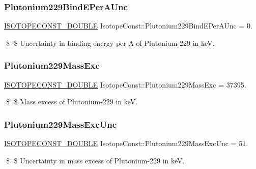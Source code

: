 \subsubsection{\texorpdfstring{Plutonium229\+Bind\+E\+Per\+A\+Unc}{Plutonium229BindEPerAUnc}}
{\footnotesize\ttfamily \mbox{\hyperlink{group___isotope_const-_macros_ga8f45a7272ce02c0b4c65c44636ed719a}{I\+S\+O\+T\+O\+P\+E\+C\+O\+N\+S\+T\+\_\+\+D\+O\+U\+B\+LE}} Isotope\+Const\+::\+Plutonium229\+Bind\+E\+Per\+A\+Unc = 0.}

\$ \$ Uncertainty in binding energy per A of Plutonium-\/229 in keV. \mbox{\label{group___isotope_const-_plutonium-_pu229_ga1e79eff8f6f987afc654c541a3240732}} 
\subsubsection{\texorpdfstring{Plutonium229\+Mass\+Exc}{Plutonium229MassExc}}
{\footnotesize\ttfamily \mbox{\hyperlink{group___isotope_const-_macros_ga8f45a7272ce02c0b4c65c44636ed719a}{I\+S\+O\+T\+O\+P\+E\+C\+O\+N\+S\+T\+\_\+\+D\+O\+U\+B\+LE}} Isotope\+Const\+::\+Plutonium229\+Mass\+Exc = 37395.}

\$ \$ Mass excess of Plutonium-\/229 in keV. \mbox{\label{group___isotope_const-_plutonium-_pu229_ga1d9d57cf21f9aab3d7fa4d27a9cb4260}} 
\subsubsection{\texorpdfstring{Plutonium229\+Mass\+Exc\+Unc}{Plutonium229MassExcUnc}}
{\footnotesize\ttfamily \mbox{\hyperlink{group___isotope_const-_macros_ga8f45a7272ce02c0b4c65c44636ed719a}{I\+S\+O\+T\+O\+P\+E\+C\+O\+N\+S\+T\+\_\+\+D\+O\+U\+B\+LE}} Isotope\+Const\+::\+Plutonium229\+Mass\+Exc\+Unc = 51.}

\$ \$ Uncertainty in mass excess of Plutonium-\/229 in keV. \mbox{\label{group___isotope_const-_plutonium-_pu229_gabd7af0bb6e82bcd8b94ab3e3c53f9ede}} 
